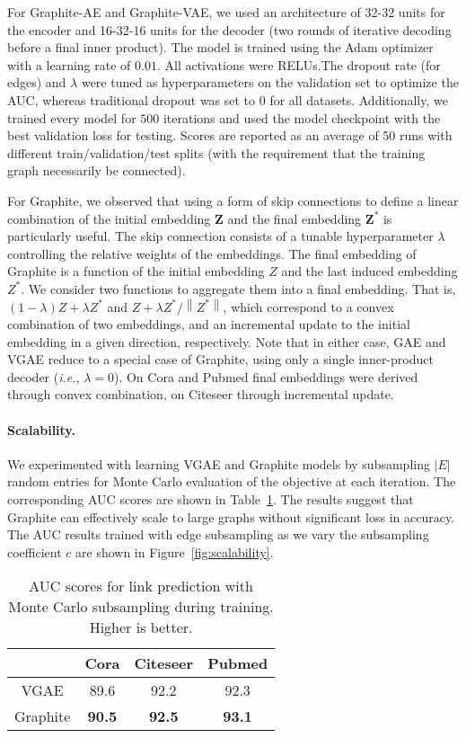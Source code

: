 \documentclass{article}
\newcommand{\name}{Graphite}
\begin{document}
For Graphite-AE and Graphite-VAE, we used an architecture of 32-32 units for the encoder and 16-32-16 units for the decoder (two rounds of iterative decoding before a final inner product). The model is trained using the Adam optimizer~\citep{kingma2013auto} with a learning rate of $0.01$. All activations were RELUs.The dropout rate (for edges) and $\lambda$ were tuned as hyperparameters on the validation set to optimize the AUC, whereas traditional dropout was set to 0 for all datasets. Additionally, we trained every model for $500$ iterations and used the model checkpoint with the best validation loss for testing.  Scores are reported as an average of 50 runs with different train/validation/test splits (with the requirement that the training graph necessarily be connected).

For \name{}, we observed that using a form of skip connections to define a linear combination of the initial embedding $\mathbf{Z}$ and the final embedding $\mathbf{Z}^*$ is particularly useful. The skip connection consists of a tunable hyperparameter $\lambda$ controlling the relative weights of the embeddings.
The final embedding of \name{} is a function of the initial embedding $Z$ and the last induced embedding $Z^*$.  We consider two functions to aggregate them into a final embedding.  That is, $(1-\lambda)Z + \lambda Z^*$ and $Z + \lambda Z^* / \left\lVert Z^* \right\rVert$, which correspond to a convex combination of two embeddings, and an incremental update to the initial embedding in a given direction, respectively. Note that in either case, GAE and VGAE reduce to a special case of \name{}, using only a single inner-product decoder (\textit{i.e.}, $\lambda=0$).  On Cora and Pubmed final embeddings were derived through convex combination, on Citeseer through incremental update.


\paragraph{Scalability.} We experimented with learning VGAE and \name{} models by subsampling $\vert E \vert$ random entries for Monte Carlo evaluation of the objective at each iteration. The corresponding AUC scores are shown in Table~\ref{table-scale}. The results suggest that \name{} can effectively scale to large graphs without significant loss in accuracy. 
The AUC results trained with edge subsampling as we vary the subsampling coefficient $c$ are shown in Figure~\ref{fig:scalability}.


\begin{table}[t]
\centering
  \caption{AUC scores for link prediction with Monte Carlo subsampling during training. Higher is better.}
  \label{table-scale}
  \vspace{0.05in}
  \centering
  \begin{tabular}{|c|c|c|c|}
    \toprule
	& Cora & Citeseer & Pubmed \\
    \midrule
    VGAE & 89.6 & 92.2 & 92.3\\
    Graphite & \textbf{90.5} & \textbf{92.5} & \textbf{93.1}\\
    \bottomrule
  \end{tabular}
\end{table}
\end{document}

